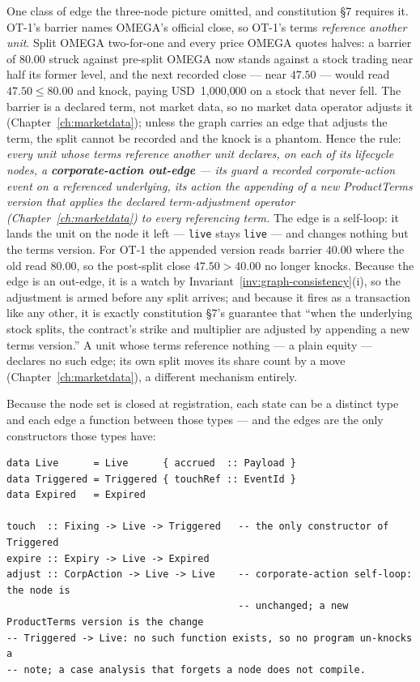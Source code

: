 \documentclass[11pt,a4paper]{article}
\newcommand{\USD}[1]{\mbox{USD~#1}}
\begin{document}
One class of edge the three-node picture omitted, and constitution \S 7 requires it. OT-1's
barrier names OMEGA's official close, so OT-1's terms \emph{reference another unit}. Split
OMEGA two-for-one and every price OMEGA quotes halves: a barrier of $80.00$ struck against
pre-split OMEGA now stands against a stock trading near half its former level, and the next
recorded close --- near $47.50$ --- would read $47.50 \le 80.00$ and knock, paying
\USD{1{,}000{,}000} on a stock that never fell. The barrier is a declared term, not market
data, so no market data operator adjusts it (Chapter~\ref{ch:marketdata}); unless the graph
carries an edge that adjusts the term, the split cannot be recorded and the knock is a
phantom. Hence the rule: \emph{every unit whose terms reference another unit declares, on
each of its lifecycle nodes, a \textbf{corporate-action out-edge} --- its guard a recorded
corporate-action event on a referenced underlying, its action the appending of a new
ProductTerms version that applies the declared term-adjustment operator
(Chapter~\ref{ch:marketdata}) to every referencing term.} The edge is a self-loop: it lands
the unit on the node it left --- \texttt{live} stays \texttt{live} --- and changes nothing
but the terms version. For OT-1 the appended version reads barrier $40.00$ where the old read
$80.00$, so the post-split close $47.50 > 40.00$ no longer knocks. Because the edge is an
out-edge, it is a watch by Invariant~\ref{inv:graph-consistency}(i), so the adjustment is
armed before any split arrives; and because it fires as a transaction like any other, it is
exactly constitution \S 7's guarantee that ``when the underlying stock splits, the contract's
strike and multiplier are adjusted by appending a new terms version.'' A unit whose terms
reference nothing --- a plain equity --- declares no such edge; its own split moves its share
count by a move (Chapter~\ref{ch:marketdata}), a different mechanism entirely.

Because the node set is closed at registration, each state can be a distinct type and
each edge a function between those types --- and the edges are the only constructors
those types have:

\begin{lstlisting}
data Live      = Live      { accrued  :: Payload }
data Triggered = Triggered { touchRef :: EventId }
data Expired   = Expired

touch  :: Fixing -> Live -> Triggered   -- the only constructor of Triggered
expire :: Expiry -> Live -> Expired
adjust :: CorpAction -> Live -> Live    -- corporate-action self-loop: the node is
                                        -- unchanged; a new ProductTerms version is the change
-- Triggered -> Live: no such function exists, so no program un-knocks a
-- note; a case analysis that forgets a node does not compile.
\end{lstlisting}
\end{document}
